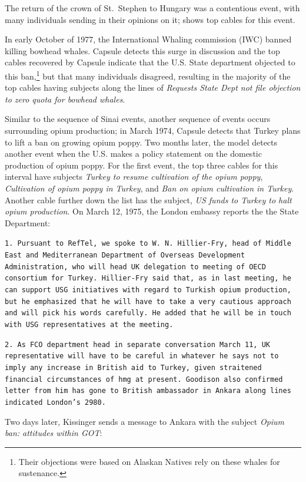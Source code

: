 The return of the crown of St.~Stephen to Hungary was a contentious event, with many individuals sending in their opinions on it;  shows top cables for this event.

In early October of 1977, the International Whaling commission (IWC) banned killing bowhead whales. Capsule detects this surge in discussion and the top cables recovered by Capsule indicate that the U.S. State department objected to this ban,\footnote{Their objections were based on Alaskan Natives rely on these whales for sustenance.} but that many individuals disagreed, resulting in the majority of the top cables having subjects along the lines of \emph{Requests State Dept not file objection to zero quota for bowhead whales}.

Similar to the sequence of Sinai events, another sequence of events occurs surrounding opium production; in March 1974, Capsule detects that Turkey plans to lift a ban on growing opium poppy.  Two months later, the model detects another event when the U.S. makes a policy statement on the domestic production of opium poppy.  For the first event, the top three cables for this interval have subjects \emph{Turkey to resume cultivation of the opium poppy}, \emph{Cultivation of opium poppy in Turkey}, and \emph{Ban on opium cultivation in Turkey}. Another cable further down the list has the subject, \emph{US funds to Turkey to halt opium production}.  On March 12, 1975, the London embassy reports the the State Department:
\begin{shaded*}
\tt{1.  Pursuant to RefTel, we spoke to W.~N.~Hillier-Fry, 
head of Middle East and Mediterranean Department
of Overseas Development Administration, who will
head UK delegation to meeting of OECD consortium for
Turkey.  Hillier-Fry said that, as in last meeting,
he can support USG initiatives with regard to Turkish
opium production, but he emphasized that he will have
to take a very cautious approach and will pick his
words carefully.  He added that he will be in touch
with USG representatives at the meeting.}

\tt{2.  As FCO department head
in separate conversation March 11, UK representative
will have to be careful in whatever he says not to
imply any increase in British aid to Turkey, given
straitened financial circumstances of hmg at present.
Goodison also confirmed letter from him has gone to
British ambassador in Ankara along lines indicated
London's 2980.}
\end{shaded*}
\noindent Two days later, Kissinger sends a message to Ankara with the subject \emph{Opium ban: attitudes within GOT}:
